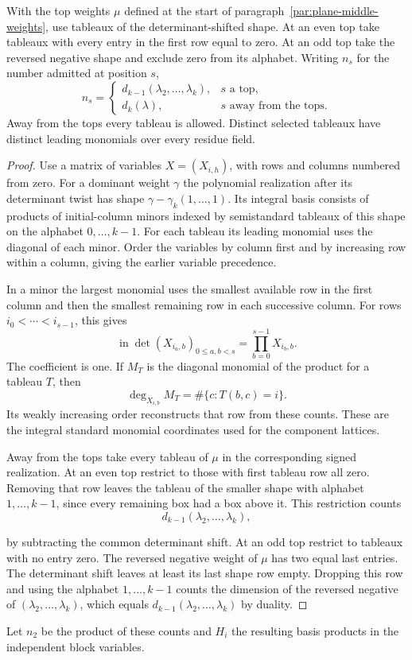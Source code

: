 \begin{auxlemma}\label{lem:bounded-tableau-count}
With the top weights \(\mu\) defined at the start of
paragraph~\ref{par:plane-middle-weights}, use tableaux of the
determinant-shifted shape. At an even top take tableaux with every entry in the first row
equal to zero. At an odd top take the reversed negative shape and exclude zero
from its alphabet. Writing \(n_s\) for the number admitted at position \(s\),
\[
 n_s=\begin{cases}d_{k-1}(\lambda_2,\ldots,\lambda_k),&s\text{ a top},\\d_k(\lambda),&s\text{ away from the tops}.\end{cases}
\]
Away from the tops every tableau is allowed. Distinct selected tableaux have distinct leading monomials over
every residue field.
\end{auxlemma}
\begin{proof}
Use a matrix of variables \(X=(X_{i,h})\), with rows and columns
numbered from zero. For a dominant weight \(\gamma\) the
polynomial realization after its determinant twist has shape
\(\gamma-\gamma_k(1,\ldots,1)\). Its integral basis consists of
products of initial-column minors indexed by semistandard
tableaux of this shape on the alphabet \(0,\ldots,k-1\).
For each tableau its leading monomial uses the diagonal of each
minor. Order the variables by column first and by increasing
row within a column, giving the earlier variable precedence.

In a minor the largest monomial uses the smallest available row
in the first column and then the smallest remaining row in each
successive column. For rows \(i_0<\cdots<i_{s-1}\), this gives
\[
 \operatorname{in}\det(X_{i_a,b})_{0\le a,b<s}
    =\prod_{b=0}^{s-1}X_{i_b,b}.
\]
The coefficient is one. If \(M_T\) is the diagonal monomial of the product for a tableau \(T\), then
\[
 \deg_{X_{i,b}}M_T=\#\{c:T(b,c)=i\}.
\]
Its weakly
increasing order reconstructs that row from these counts. These are the integral
standard monomial coordinates used for the component lattices.
\cite[Theorem II.2.16]{abw-schur}

Away from the tops take every tableau of \(\mu\) in the
corresponding signed realization. At an even top restrict to
those with first tableau row all zero. Removing that row
leaves the tableau of the smaller shape with alphabet
\(1,\ldots,k-1\), since every remaining box had a box above it.
This restriction counts
\[
 d_{k-1}(\lambda_2,\ldots,\lambda_k),
\]

by subtracting the common determinant shift. At an odd top
restrict to tableaux with no entry zero. The reversed negative
weight of \(\mu\) has two equal last entries. The determinant
shift leaves at least its last shape row empty. Dropping this
row and using the alphabet \(1,\ldots,k-1\) counts the dimension
of the reversed negative of \((\lambda_2,\ldots,\lambda_k)\),
which equals \(d_{k-1}(\lambda_2,\ldots,\lambda_k)\) by duality.
\end{proof}
Let \(n_2\) be the product of these counts and \(H_i\) the
resulting basis products in the independent block variables.

